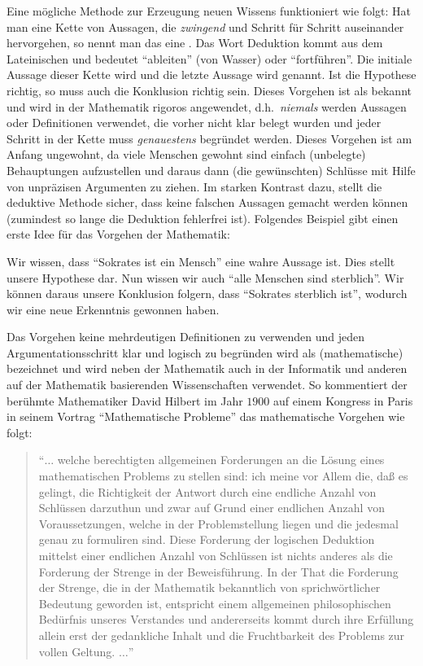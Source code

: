 Eine mögliche Methode zur Erzeugung neuen Wissens funktioniert wie folgt: Hat man 
eine Kette von Aussagen, die \emph{zwingend} und
Schritt für Schritt auseinander hervorgehen, so nennt man das eine
. Das Wort Deduktion kommt aus dem Lateinischen und
bedeutet "`ableiten"' (von Wasser) oder "`fortführen"'. Die initiale Aussage
dieser Kette wird  und die letzte Aussage wird
 genannt. Ist die Hypothese richtig, so muss auch
die Konklusion richtig sein. Dieses Vorgehen ist als 
 bekannt und wird in der Mathematik rigoros 
angewendet, d.h.~\emph{niemals} werden Aussagen oder Definitionen verwendet, die
vorher nicht klar belegt wurden und jeder Schritt in der Kette muss \emph{genauestens}
begründet werden. Dieses Vorgehen ist am Anfang ungewohnt, da 
viele Menschen gewohnt sind einfach (unbelegte) Behauptungen aufzustellen und
daraus dann (die gewünschten) Schlüsse mit Hilfe von unpräzisen Argumenten zu ziehen.  
Im starken Kontrast dazu, stellt die deduktive Methode sicher, dass keine falschen 
Aussagen gemacht werden können (zumindest so lange die Deduktion fehlerfrei ist). 
Folgendes Beispiel gibt einen erste Idee für das Vorgehen der Mathematik:

Wir wissen, dass "`Sokrates ist ein Mensch"' eine wahre Aussage
ist. Dies stellt unsere Hypothese dar. Nun wissen wir auch "`alle
Menschen sind sterblich"'. Wir können daraus unsere Konklusion
folgern, dass "`Sokrates sterblich ist"', wodurch wir eine neue
Erkenntnis gewonnen haben.

Das Vorgehen keine mehrdeutigen Definitionen zu verwenden und jeden
Argumentationsschritt klar und logisch zu begründen wird als
(mathematische)  bezeichnet und wird neben der
Mathematik auch in der Informatik und anderen auf der Mathematik
basierenden Wissenschaften verwendet. So kommentiert der berühmte
Mathematiker David Hilbert im Jahr $1900$ auf einem Kongress in Paris in
seinem Vortrag "`Mathematische Probleme"' das mathematische Vorgehen
wie folgt:

\begin{quote}
"`$\ldots$ welche berechtigten allgemeinen Forderungen an die Lösung
eines mathematischen Problems zu stellen sind: ich meine vor Allem
die, daß es gelingt, die Richtigkeit der Antwort durch eine endliche
Anzahl von Schlüssen darzuthun und zwar auf Grund einer endlichen
Anzahl von Voraussetzungen, welche in der Problemstellung liegen und
die jedesmal genau zu formuliren sind. Diese Forderung der logischen
Deduktion mittelst einer endlichen Anzahl von Schlüssen ist nichts
anderes als die Forderung der Strenge in der Beweisführung. In der
That die Forderung der Strenge, die in der Mathematik bekanntlich von
sprichwörtlicher Bedeutung geworden ist, entspricht einem allgemeinen
philosophischen Bedürfnis unseres Verstandes und andererseits kommt
durch ihre Erfüllung allein erst der gedankliche Inhalt und die
Fruchtbarkeit des Problems zur vollen Geltung. $\dots$"'
\end{quote}

